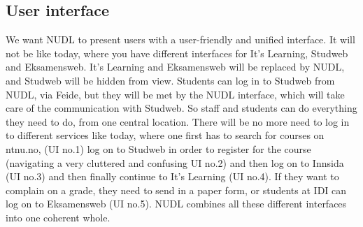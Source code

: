 	\subsection{User interface} 
		We want NUDL to present users with a user-friendly and unified interface. It will not be like today, where you have different interfaces for It's Learning, Studweb and Eksamensweb. It's Learning and Eksamensweb will be replaced by NUDL, and Studweb will be hidden from view. Students can log in to Studweb from NUDL, via Feide, but they will be met by the NUDL interface, which will take care of the communication with Studweb. So staff and students can do everything they need to do, from one central location. There will be no more need to log in to different services like today, where one first has to search for courses on ntnu.no, (UI no.1) log on to Studweb in order to register for the course (navigating a very cluttered and confusing UI no.2) and then log on to Innsida (UI no.3) and then finally continue to It's Learning (UI no.4). If they want to complain on a grade, they need to send in a paper form, or students at IDI can log on to Eksamensweb (UI no.5). NUDL combines all these different interfaces into one coherent whole. 